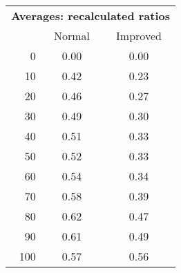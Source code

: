 \begin{tabular}{r|cc}
      \multicolumn{3}{c}{{\bf Averages: recalculated ratios }} \\
      & Normal & Improved \\ \hline\hline
0
& 0.00
& 0.00
\\
10
& 0.42
& 0.23
\\
20
& 0.46
& 0.27
\\
30
& 0.49
& 0.30
\\
40
& 0.51
& 0.33
\\
50
& 0.52
& 0.33
\\
60
& 0.54
& 0.34
\\
70
& 0.58
& 0.39
\\
80
& 0.62
& 0.47
\\
90
& 0.61
& 0.49
\\
100
& 0.57
& 0.56
\\
\end{tabular}
